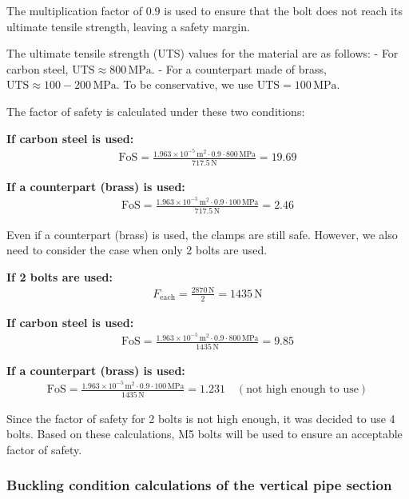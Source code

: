 \documentclass[12pt]{article}
\begin{document}
The multiplication factor of \( 0.9 \) is used to ensure that the bolt does not reach its ultimate tensile strength, leaving a safety margin.

The ultimate tensile strength (UTS) values for the material are as follows:
- For carbon steel, \( \text{UTS} \approx 800 \, \text{MPa} \).
- For a counterpart made of brass, \( \text{UTS} \approx 100 - 200 \, \text{MPa} \). To be conservative, we use \( \text{UTS} = 100 \, \text{MPa} \).

The factor of safety is calculated under these two conditions:

\textbf{If carbon steel is used:}
\begin{align}
\text{FoS} = \frac{1.963 \times 10^{-5} \, \text{m}^2 \cdot 0.9 \cdot 800 \, \text{MPa}}{717.5 \, \text{N}} = 19.69
\end{align}

\textbf{If a counterpart (brass) is used:}
\begin{align}
\text{FoS} = \frac{1.963 \times 10^{-5} \, \text{m}^2 \cdot 0.9 \cdot 100 \, \text{MPa}}{717.5 \, \text{N}} = 2.46
\end{align}

Even if a counterpart (brass) is used, the clamps are still safe. However, we also need to consider the case when only 2 bolts are used.

\textbf{If 2 bolts are used:}
\begin{align}
F_{\text{each}} = \frac{2870 \, \text{N}}{2} = 1435 \, \text{N}
\end{align}

\textbf{If carbon steel is used:}
\begin{align}
\text{FoS} = \frac{1.963 \times 10^{-5} \, \text{m}^2 \cdot 0.9 \cdot 800 \, \text{MPa}}{1435 \, \text{N}} = 9.85
\end{align}

\textbf{If a counterpart (brass) is used:}
\begin{align}
\text{FoS} = \frac{1.963 \times 10^{-5} \, \text{m}^2 \cdot 0.9 \cdot 100 \, \text{MPa}}{1435 \, \text{N}} = 1.231 \quad (\text{not high enough to use})
\end{align}

Since the factor of safety for 2 bolts is not high enough, it was decided to use 4 bolts. Based on these calculations, M5 bolts will be used to ensure an acceptable factor of safety.



\subsubsection{Buckling condition calculations of the vertical pipe section}
\end{document}
